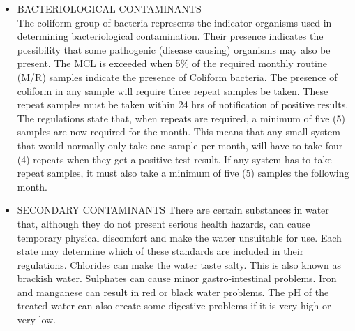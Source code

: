 \documentclass{article}
\begin{document}
\begin{itemize}
\item BACTERIOLOGICAL CONTAMINANTS  \\
The coliform group of bacteria represents the indicator organisms used in determining bacteriological contamination. Their presence indicates the possibility that some pathogenic (disease causing) organisms may also be present. The MCL is exceeded when 5\% of the required monthly routine (M/R) samples indicate the presence of Coliform bacteria. The presence of coliform in any sample will require three repeat samples be taken. These repeat samples must be taken within 24 hrs of notification of positive results.  \\
The regulations state that, when repeats are required, a minimum of five (5) samples are now required for the month. This means that any small system that would normally only take one sample per month, will have to take four (4) repeats when they get a positive test result. If any system has to take repeat samples, it must also take a minimum of five (5) samples the following month.  \\
\item SECONDARY CONTAMINANTS There are certain substances in water that, although they do not present serious health hazards, can cause temporary physical discomfort and make the water unsuitable for use. Each state may determine which of these standards are included in their regulations. Chlorides can make the water taste salty. This is also known as brackish water. Sulphates can cause minor gastro-intestinal problems. Iron and manganese can result in red or black water problems. The pH of the treated water can also create some digestive problems if it is very high or very low.
\end{itemize}
\end{document}
